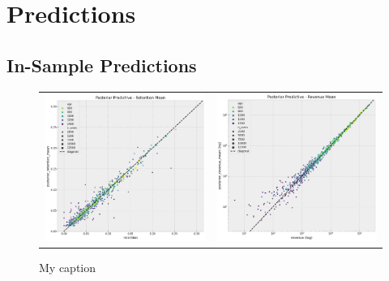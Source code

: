 \documentclass[11pt]{amsart}
\begin{document}
\section{Predictions}

\subsection{In-Sample Predictions}

\begin{figure}
    \begin{tabular}{cc}
        \includegraphics[width=0.5 \textwidth]{images/revenue_retention_45_0.png} & 
        \includegraphics[width=0.5 \textwidth]{images/revenue_retention_47_0.png}
    \end{tabular}
    \caption{My caption}
\end{figure}
\end{document}
